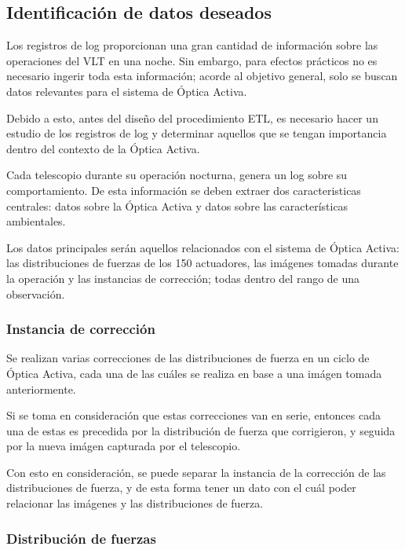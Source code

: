 
\subsection{Identificación de datos deseados}

Los registros de log proporcionan una gran cantidad de información sobre las operaciones del VLT en una noche. Sin embargo, para efectos prácticos no es necesario ingerir toda esta información; acorde al objetivo general, solo se buscan datos relevantes para el sistema de Óptica Activa.

Debido a esto, antes del diseño del procedimiento ETL, es necesario hacer un estudio de los registros de log y determinar aquellos que se tengan importancia dentro del contexto de la Óptica Activa.

Cada telescopio durante su operación nocturna, genera un log sobre su comportamiento. De esta información se deben extraer dos caracteristicas centrales: datos sobre la Óptica Activa y datos sobre las características ambientales.

Los datos principales serán aquellos relacionados con el sistema de Óptica Activa: las distribuciones de fuerzas de los 150 actuadores, las imágenes tomadas durante la operación y las instancias de corrección; todas dentro del rango de una observación.

\subsubsection{Instancia de corrección}

Se realizan varias correcciones de las distribuciones de fuerza en un ciclo de Óptica Activa, cada una de las cuáles se realiza en base a una imágen tomada anteriormente.

Si se toma en consideración que estas correcciones van en serie, entonces cada una de estas es precedida por la distribución de fuerza que corrigieron, y seguida por la nueva imágen capturada por el telescopio.

Con esto en consideración, se puede separar la instancia de la corrección de las distribuciones de fuerza, y de esta forma tener un dato con el cuál poder relacionar las imágenes y las distribuciones de fuerza.

\subsubsection{Distribución de fuerzas}

